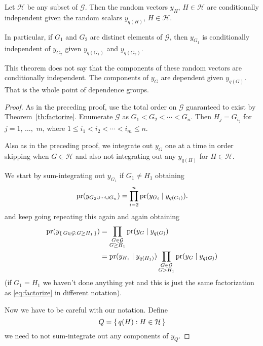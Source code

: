 \begin{theorem} \label{th:markov-two}
Let $\mathcal{H}$ be any subset of $\mathcal{G}$.  Then the random vectors
$y_H$, $H \in \mathcal{H}$ are conditionally independent given
the random scalars $y_{q(H)}$, $H \in \mathcal{H}$.
\end{theorem}
In particular, if $G_1$ and $G_2$ are distinct elements of $\mathcal{G}$,
then $y_{G_1}$ is conditionally independent of $y_{G_2}$
given $y_{q(G_1)}$ and $y_{q(G_2)}$.

This theorem does not say that the components of these random vectors are
conditionally independent.  The components of $y_G$ are dependent given
$y_{q(G)}$.  That is the whole point of dependence groups.
\begin{proof}
As in the preceding proof, use the total order on $\mathcal{G}$ guaranteed
to exist by Theorem~\ref{th:factorize}.
Enumerate $\mathcal{G}$ as $G_1 < G_2 < \cdots < G_n$.
Then $H_j = G_{i_j}$ for $j = 1$, $\ldots,$ $m$,
where $1 \le i_1 < i_2 < \cdots < i_m \le n$.

Also as in the preceding proof, we integrate out $y_G$ one at a time
in order skipping when $G \in \mathcal{H}$ and also not integrating out
any $y_{q(H)}$ for $H \in \mathcal{H}$.

We start by sum-integrating out $y_{G_1}$ if $G_1 \neq H_1$ obtaining
$$
   \operatorname{pr}(y_{G_2 \cup \cdots \cup G_n})
   =
   \prod_{i = 2}^n \operatorname{pr}(y_{G_i} \mid y_{q(G_i)}).
$$
and keep going repeating this again and again obtaining
\begin{align*}
   \operatorname{pr}(y_{\{\, G \in \mathcal{G} : G \ge H_1 \,\}})
   & =
   \prod_{\substack{G \in \mathcal{G} \\ G \ge H_1}}
   \operatorname{pr}(y_G \mid y_{q(G)})
   \\
   & =
   \operatorname{pr}(y_{H_1} \mid y_{q(H_1)})
   \prod_{\substack{G \in \mathcal{G} \\ G > H_1}}
   \operatorname{pr}(y_G \mid y_{q(G)})
\end{align*}
(if $G_1 = H_1$ we haven't done anything yet and this is just the same
factorization as \eqref{eq:factorize} in different notation).

Now we have to be careful with our notation.  Define
$$
   Q = \{\,  q(H) : H \in \mathcal{H}  \,\}
$$
we need to not sum-integrate out any components of $y_Q$.


\end{proof}
